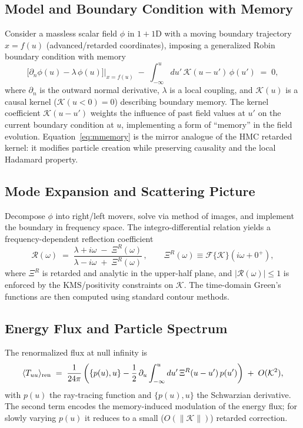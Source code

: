 \documentclass[11pt,a4paper]{article}
\newcommand{\HMC}{\textsc{HMC}\xspace}
\theoremstyle{plain}
\theoremstyle{definition}
\theoremstyle{remark}
\begin{document}
\subsection{Model and Boundary Condition with Memory}
Consider a massless scalar field $\phi$ in $1+1$D with a moving boundary trajectory $x=f(u)$ (advanced/retarded coordinates), imposing a generalized Robin boundary condition with memory
\begin{equation}
\left.\Big[\partial_n \phi(u)-\lambda\,\phi(u)\Big]\right|_{x=f(u)}\;-\;\int_{-\infty}^u du'\,\mathcal{K}(u-u')\,\phi(u')\;=\;0,
\label{eq:mmemory}
\end{equation}
where $\partial_n$ is the outward normal derivative, $\lambda$ is a local coupling, and $\mathcal{K}(u)$ is a causal kernel ($\mathcal{K}(u<0)=0$) describing boundary memory. The kernel coefficient $\mathcal{K}(u-u')$ weights the influence of past field values at $u'$ on the current boundary condition at $u$, implementing a form of ``memory'' in the field evolution. Equation~\eqref{eq:mmemory} is the mirror analogue of the \HMC{} retarded kernel: it modifies particle creation while preserving causality and the local Hadamard property.

\subsection{Mode Expansion and Scattering Picture}
Decompose $\phi$ into right/left movers, solve via method of images, and implement the boundary in frequency space. The integro-differential relation yields a frequency-dependent reflection coefficient
\begin{equation}
\mathcal{R}(\omega)\;=\;\frac{\lambda+i\omega\;-\;\Xi^R(\omega)}{\lambda-i\omega\;+\;\Xi^R(\omega)}\,,
\qquad \Xi^R(\omega)\equiv \mathcal{F}\{\mathcal{K}\}(i\omega+0^+),
\end{equation}
where $\Xi^R$ is retarded and analytic in the upper-half plane, and $|\mathcal{R}(\omega)|\le 1$ is enforced by the KMS/positivity constraints on $\mathcal{K}$. The time-domain Green's functions are then computed using standard contour methods.

\subsection{Energy Flux and Particle Spectrum}
The renormalized flux at null infinity is
\begin{equation}
\langle T_{uu}\rangle_{\rm ren}\;=\;\frac{1}{24\pi}\left(\{p(u),u\}-\frac{1}{2}\,\partial_u \int_{-\infty}^u du'\,\Xi^R(u-u')\,p(u')\right)\;+\;O(\mathcal{K}^2),
\end{equation}
with $p(u)$ the ray-tracing function and $\{p(u),u\}$ the Schwarzian derivative. The second term encodes the memory-induced modulation of the energy flux; for slowly varying $p(u)$ it reduces to a small ($O(\|\mathcal{K}\|)$) retarded correction.
\end{document}
